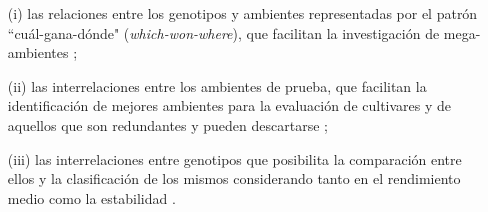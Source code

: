 \begin{itemize}
\item[(i)] las relaciones entre los genotipos y ambientes representadas por el patrón ``cuál-gana-dónde" (\emph{which-won-where}), que facilitan la investigación de mega-ambientes \citep{GauchZobel1997};

\item[(ii)] las interrelaciones entre los ambientes de prueba, que facilitan la identificación de mejores ambientes para la evaluación de cultivares \citep{Cooperetal1997} y de aquellos que son redundantes y pueden descartarse \citep{YanRajcan2002};

\item[(iii)] las interrelaciones entre genotipos que posibilita la comparación entre ellos y la clasificación de los mismos considerando tanto en el rendimiento medio como la estabilidad \citep{Yanetal2001}.
\end{itemize}

